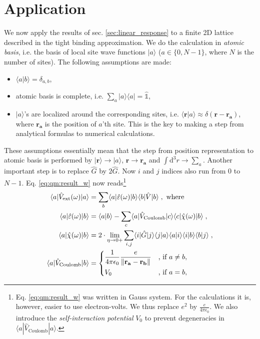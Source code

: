 \documentclass[a4paper,12pt]{article}
\begin{document}
\section{Application}
    We now apply the results of sec. \ref{sec:linear_response} to a finite 2D lattice described in the tight binding approximation. We do the calculation in \textit{atomic basis}, i.e. the basis of local site wave functions $|a\rangle$ ($a \in \{0, N-1\}$, where $N$ is the number of sites). The following assumptions are made:
    \begin{itemize}
    \item $\langle a | b \rangle = \delta_{a,b}$,
    \item atomic basis is complete, i.e. $\sum_{a} |a\rangle\! \langle a| = \hat{\mathds{1}}$,
    \item $| a \rangle$'s are localized around the corresponding sites, i.e. $\langle \mathbf{r} | a \rangle \approx \delta(\mathbf{r} - \mathbf{r_a})$, where $\mathbf{r_a}$ is the position of $a$'th site. This is the key to making a step from analytical formulas to numerical calculations.
    \end{itemize}
    These assumptions essentially mean that the step from position representation to atomic basis is performed by $|\mathbf{r}\rangle \to |a\rangle$, $\mathbf{r} \to \mathbf{r_a}$ and $\int\!\text{d}^3 r \to \sum_{a}$. Another important step is to replace $\hat G$ by $2\hat G$. Now $i$ and $j$ indices also run from 0 to $N-1$. Eq. \eqref{eq:qm:result_w} now reads\footnote{ %
Eq. \eqref{eq:qm:result_w} was written in Gauss system. For the calculations it is, however, easier to use electron-volts. We thus replace $e^2$ by $\frac{e}{4\pi\epsilon_0}$. We also introduce the \textit{self-interaction potential} $V_0$ to prevent degeneracies in $\langle a | \hat V_\text{Coulomb} | a \rangle$.
}
    \begin{equation} \label{eq:appl:result_w}
    \begin{aligned}
        \langle a | \hat V_\text{ext}(\omega) | a \rangle &= \sum_{b} \langle a | \hat \varepsilon(\omega) | b \rangle \langle b | \hat V | b \rangle \; , \text{ where} \\
        \langle a | \hat\varepsilon(\omega) | b \rangle
            &= \langle a | b \rangle - \sum_{c} \langle a | \hat V_\text{Coulomb} | c \rangle \langle c | \hat\chi(\omega) | b \rangle \; , \\
        \langle a | \hat \chi(\omega) | b \rangle 
            &= 2\cdot \lim_{\eta \to 0+} \sum_{i,j} \langle i | \hat G | j \rangle \langle j | a \rangle \langle a | i \rangle \langle i | b \rangle \langle b | j \rangle\; , \\
        \langle a | \hat V_\text{Coulomb} | b \rangle 
            &= \begin{dcases} 
                \frac{1}{4\pi\epsilon_0} \frac{e}{\|\mathbf{r_a} - \mathbf{r_b}\|} & \text{, if } a \neq b, \\
                V_0 & \text{, if } a = b,
                \end{dcases}
    \end{aligned}
    \end{equation}
\end{document}
